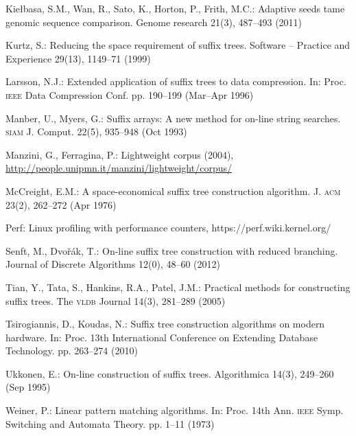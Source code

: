 \documentclass{llncs}
\let\bibtla\textsc
\begin{document}
\begin{thebibliography}{10}
Kie{\l}basa, S.M., Wan, R., Sato, K., Horton, P., Frith, M.C.: Adaptive seeds
  tame genomic sequence comparison. Genome research  21(3),  487--493 (2011)

Kurtz, S.: Reducing the space requirement of suffix trees. Software -- Practice
  and Experience  29(13),  1149--71 (1999)

Larsson, N.J.: Extended application of suffix trees to data compression. In:
  Proc. {\bibtla{ieee}} Data Compression Conf. pp. 190--199 (Mar--Apr 1996)

Manber, U., Myers, G.: Suffix arrays: A new method for on-line string searches.
  {\bibtla{siam}} J. Comput.  22(5),  935--948 (Oct 1993)

Manzini, G., Ferragina, P.: Lightweight corpus (2004),
  \url{http://people.unipmn.it/manzini/lightweight/corpus/}

McCreight, E.M.: A space-economical suffix tree construction algorithm. J.
  {\bibtla{acm}}  23(2),  262--272 (Apr 1976)

Perf: Linux profiling with performance counters,
  https://\nolinebreak[1]perf.wiki.kernel.org/

Senft, M., Dvořák, T.: On-line suffix tree construction with reduced
  branching. Journal of Discrete Algorithms  12(0),  48--60 (2012)

Tian, Y., Tata, S., Hankins, R.A., Patel, J.M.: Practical methods for
  constructing suffix trees. The \bibtla{vldb} Journal  14(3),  281--289 (2005)

Tsirogiannis, D., Koudas, N.: Suffix tree construction algorithms on modern
  hardware. In: Proc. 13th International Conference on Extending Database
  Technology. pp. 263--274 (2010)

Ukkonen, E.: On-line construction of suffix trees. Algorithmica  14(3),
  249--260 (Sep 1995)

Weiner, P.: Linear pattern matching algorithms. In: Proc. 14th Ann.
  {\bibtla{ieee}} Symp. Switching and Automata Theory. pp. 1--11 (1973)

\end{thebibliography}
\end{document}
